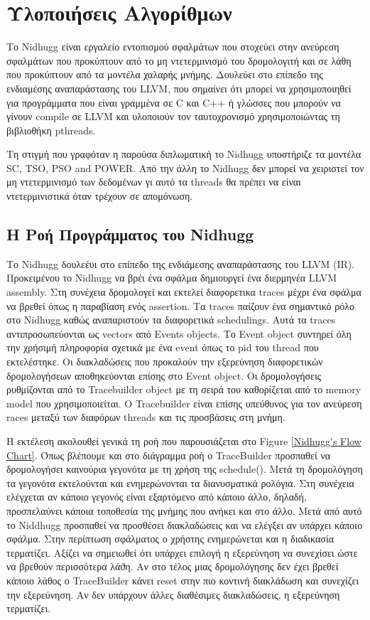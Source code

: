 \chapter{Υλοποιήσεις Αλγορίθμων}
\label{implementations}

Το Nidhugg είναι εργαλείο εντοπισμού σφαλμάτων που στοχεύει στην ανεύρεση σφαλμάτων που προκύπτουν από το μη ντετερμινισμό του δρομολογιτή
και σε λάθη που προκύπτουν από τα μοντέλα χαλαρής μνήμης.
Δουλεύει στο επίπεδο της ενδιαμέσης αναπαράστασης του LLVM, που σημαίνει ότι μπορεί να χρησιμοποιηθεί για προγράμματα που είναι γραμμένα
σε C και C++ ή γλώσσες που μπορούν να γίνουν compile σε LLVM και υλοποιούν τον ταυτοχρονισμό χρησιμοποιώντας τη βιβλιοθήκη pthreads.

Τη στιγμή που γραφόταν η παρούσα διπλωματική το Nidhugg υποστήριζε τα μοντέλα SC, TSO, PSO and POWER. 
Από την άλλη το Nidhugg δεν μπορεί να χειριστεί τον μη ντετερμινισμό των δεδομένων γι αυτό τα threads θα πρέπει να είναι ντετερμινιστικά 
όταν τρέχουν σε απομόνωση.

\section{Η Ροή Προγράμματος του Nidhugg}

Το Nidhugg δουλεέυι στο επίπεδο της ενδιάμεσης αναπαράστασης του LLVM (IR). Προκειμένου το Nidhugg να βρέι ένα σφάλμα δημιουργεί
ένα διερμηνέα LLVM assembly.
Στη συνέχεια δρομολογεί και εκτελεί διαφορετικα traces μέχρι ένα σφάλμα να βρεθεί όπως η παραβίαση ενός assertion. 
Τα traces παίζουν ένα σημαντικό ρόλο στο Nidhugg καθώς αναπαριστούν τα διαφορετικά schedulings.
Αυτά τα traces αντιπροσωπεύονται ως vectors από Events objects. Το Event object συντηρεί όλη την χρήσιμή πληροφορία σχετικά με
ένα event όπως το pid του thread που εκτελέστηκε. Οι διακλαδώσεις που προκαλούν την εξερεύνηση διαφορετικών δρομολογήσεων
αποθηκεύονται επίσης στο Event object. Οι δρομολογήσεις ρυθμίζονται από το Tracebuilder object με τη σειρά του καθορίζεται από
το memory model που χρησιμοποιείται. Ο Tracebuilder είναι επίσης υπεύθυνος για τον ανεύρεση races μεταξύ των διαφόρων threads και τις προσβάσεις
στη μνήμη.

Η εκτέλεση ακολουθεί γενικά τη ροή που παρουσιάζεται στο Figure \ref{Nidhugg's Flow Chart}. Όπως βλέπουμε και στο διάγραμμα
ροή ο TraceBuilder προσπαθεί να δρομολογήσει καινούρια γεγονότα με τη χρήση της schedule(). 
Μετά τη δρομολόγηση τα γεγονότα εκτελούνται και ενημερώνονται τα διανυσματικά ρολόγια. Στη συνέχεια ελέγχεται 
αν κάποιο γεγονός είναι εξαρτόμενο από κάποιο άλλο, δηλαδή, προσπελαύνει κάποια τοποθεσία της μνήμης που ανήκει και στο
άλλο. Μετά από αυτό το Niddhugg προσπαθεί να προσθέσει διακλαδώσεις και να ελέγξει αν υπάρχει κάποιο σφάλμα.
Στην περίπτωση σφάλματος ο χρήστης ενημερώνεται και η διαδικασία τερματίζει.  
Αξίζει να σημειωθεί ότι υπάρχει επιλογή η εξερεύνηση να συνεχίσει ώστε να βρεθούν περισσότερα λάϑη. 
Αν στο τέλος μιας δρομολόγησης δεν έχει βρεθεί κάποιο λάθος ο TraceBuilder κάνει reset στην πιο κοντινή 
διακλάδωση και συνεχίζει την εξερεύνηση. Αν δεν υπάρχουν άλλες διαθέσιμες διακλαδώσεις, η εξερεύνηση τερματίζει.

